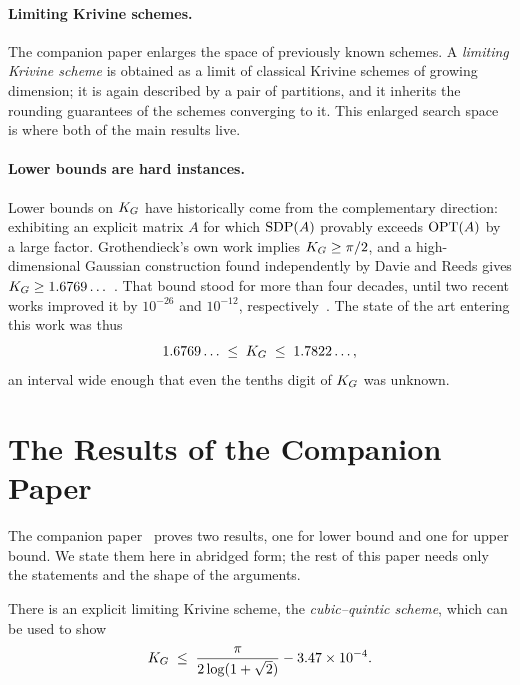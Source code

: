\paragraph{Limiting Krivine schemes.}
The companion paper enlarges the space of previously known schemes.
A \emph{limiting Krivine scheme} is obtained as a limit of classical Krivine schemes of growing dimension; it is again described by a pair of partitions, and it inherits the rounding guarantees of the schemes converging to it.
This enlarged search space is where both of the main results live.

\paragraph{Lower bounds are hard instances.}
Lower bounds on $K_G$ have historically come from the complementary direction: exhibiting an explicit matrix $A$ for which $\operatorname{SDP}(A)$ provably exceeds $\operatorname{OPT}(A)$ by a large factor.
Grothendieck's own work implies $K_G\ge\pi/2$, and a high-dimensional Gaussian construction found independently by Davie and Reeds gives $K_G\ge1.6769\ldots$~\cite{Davie1984LowerBoundKG,Reeds1991LowerBoundKG}.
That bound stood for more than four decades, until two recent works improved it by $10^{-26}$ and $10^{-12}$, respectively~\cite{heilman2026lowerboundgrothendiecksconstant,jones2026grothendieckconstantstrictlylarger}.
The state of the art entering this work was thus
\[
    1.6769\ldots \;\le\; K_G \;\le\; 1.7822\ldots,
\]
an interval wide enough that even the tenths digit of $K_G$ was unknown.

\section{The Results of the Companion Paper}
\label{sec:companion-results}

The companion paper~\cite{saha2026new} proves two results, one for lower bound and one for upper bound.
We state them here in abridged form; the rest of this paper needs only the statements and the shape of the arguments.

\begin{theorem}
\label{thm:ub-abridged}
\label{thm:cubic-quintic-upper-bound}
There is an explicit limiting Krivine scheme, the \emph{cubic--quintic scheme}, which can be used to show
\[
    K_G
    \;\le\;
    \frac{\pi}{2\log(1+\sqrt2)} - 3.47\times10^{-4}.
\]
\end{theorem}

